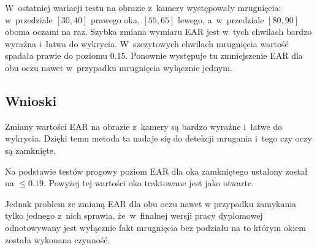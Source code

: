 W~ostatniej wariacji testu na obrazie z~kamery występowały mrugnięcia: w~przedziale $[30,40]$ prawego oka, $[55,65]$ lewego, a~w~przedziale $[80,90]$ oboma oczami na raz. Szybka zmiana wymiaru EAR jest w~tych chwilach bardzo wyraźna i~łatwa do wykrycia. W~szczytowych chwilach mrugnięcia wartość spadała prawie do poziomu $0.15$. Ponownie występuje tu zmniejszenie EAR dla obu oczu nawet w~przypadku mrugnięcia wyłącznie jednym. 


\subsection{Wnioski}

Zmiany wartości EAR na obrazie z~kamery są bardzo wyraźne i~łatwe do wykrycia. Dzięki temu metoda ta nadaje się do detekcji mrugania i~tego czy oczy są zamknięte. 

\vspace{3mm}

Na podstawie testów progowy poziom EAR dla oka zamkniętego ustalony został na $\leq0.19$. Powyżej tej wartości oko traktowane jest jako otwarte. 

\vspace{3mm}

Jednak problem ze zmianą EAR dla obu oczu nawet w przypadku zamykania tylko jednego z~nich sprawia, że~w~finalnej wersji pracy dyplomowej odnotowywany jest wyłącznie fakt mrugnięcia bez podziału na to którym okiem została wykonana czynność.
